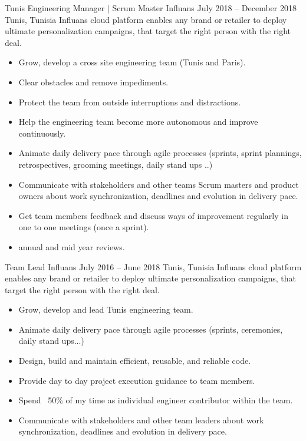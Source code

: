 \documentclass[10pt,a4paper]{resume-settings}
\begin{document}
\cvevent
    {Tunis Engineering Manager | Scrum Master}
    {Influans}
    {July 2018 -- December 2018}
    {Tunis, Tunisia}
    {Influans cloud platform enables any brand or retailer to deploy ultimate personalization campaigns, that target the right person with the right deal.}
    \begin{itemize}
         \item Grow, develop a cross site engineering team (Tunis and Paris).
        \item Clear obstacles and remove impediments.
        \item Protect the team from outside interruptions and distractions.
        \item Help the engineering team become more autonomous and improve continuously.
        \item Animate daily delivery pace through agile processes (sprints, sprint plannings, retrospectives, grooming meetings, daily stand ups ..)
        \item Communicate with stakeholders and other teams Scrum masters and product owners about work synchronization, deadlines and evolution in delivery pace.
        \item Get team members feedback and discuss ways of improvement regularly in one to one meetings (once a sprint).
        \item annual and mid year reviews.
    \end{itemize}
\divider

\cvevent
    {Team Lead}
    {Influans}
    {July 2016 -- June 2018}
    {Tunis, Tunisia}
    {Influans cloud platform enables any brand or retailer to deploy ultimate personalization campaigns, that target the right person with the right deal.}
    \begin{itemize}
        \item Grow, develop and lead Tunis engineering team.
        \item Animate daily delivery pace through agile processes (sprints, ceremonies, daily stand ups...)
        \item Design, build and maintain efficient, reusable, and reliable code.
        \item Provide day to day project execution guidance to team members.
        \item Spend ~50\% of my time as individual engineer contributor within the team.
        \item Communicate with stakeholders and other team leaders about work synchronization, deadlines and evolution in delivery pace.
    \end{itemize}
\end{document}
